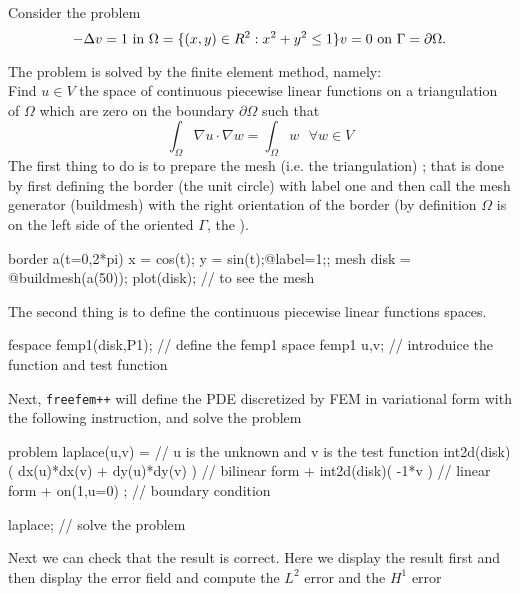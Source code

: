 

Consider the problem
\begin{equation}
 -\Delta v = 1 \hbox{ in } \Omega=\{(x,y)\in R^2 : x^2+y^2\le
1\}
\\
v=0\hbox{ on } \Gamma=\partial\Omega.
\end{equation}

The problem is solved by the finite element method, namely:
\\
Find $u\in V$ the space of continuous piecewise linear functions
on a triangulation of $\Omega$ which are zero on the boundary
$\partial\Omega$ such that
\begin{equation}
    \int_\Omega \nabla u\cdot\nabla w = \int_\Omega w~~~\forall
    w\in V
\end{equation}
The first thing to do is to prepare the mesh (i.e. the triangulation) ;
that is done by first defining the border (the
unit circle) with label one  and then call the mesh generator (buildmesh) with
the right orientation of the border (by definition $\Omega$ is
on the left side of the oriented $\Gamma$, the ).

\bFF

border a(t=0,2*pi){ x = cos(t); y = sin(t);@label=1;};
mesh disk = @buildmesh(a(50));
plot(disk);  // to see the mesh
\eFF

The second thing is to define the continuous piecewise linear functions spaces.

\bFF

fespace femp1(disk,P1);  // define the femp1 space
femp1 u,v;  //  introduice the function and test function
\eFF

Next, \texttt{freefem++} will define
the PDE discretized by FEM in variational form with the following
instruction,  and solve the problem

\bFF

  problem laplace(u,v) =  // u is the unknown and v is the test function
    int2d(disk)( dx(u)*dx(v) + dy(u)*dy(v) )     //  bilinear form
  + int2d(disk)( -1*v )                          //  linear form
  + on(1,u=0) ;                                // boundary condition

laplace;  // solve the problem
\eFF

Next we can check that the result is correct.
Here we display the result first and then display the error field
and compute the $L^2$ error and the $H^1$ error

\bFF

